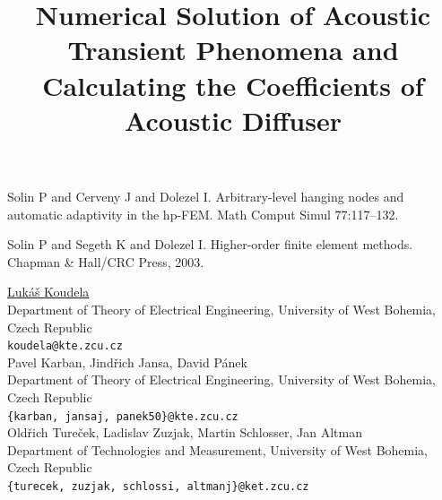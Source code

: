 \documentclass[article, A4, 11pt]{llncs}%
\begin{document}

\begin{thebibliography}{10}
{\sc Solin P and Cerveny J and Dolezel I}. {Arbitrary-level hanging nodes and automatic adaptivity in the hp-FEM}. Math Comput Simul 77:117–132.

{\sc Solin P and Segeth K and Dolezel I}. {Higher-order finite element methods}. Chapman \& Hall/CRC Press, 2003.
\end{thebibliography} %

\title{Numerical Solution of Acoustic Transient Phenomena and Calculating the Coefficients of Acoustic Diffuser}
 \author{} \institute{}
\maketitle
\begin{center}
{\large \underline{Lukáš Koudela}}\\
Department of Theory of Electrical Engineering, University of West Bohemia, Czech Republic\\
{\tt koudela@kte.zcu.cz}
\\ \vspace{4mm}
{\large Pavel Karban, Jindřich Jansa, David Pánek}\\
Department of Theory of Electrical Engineering, University of West Bohemia, Czech Republic\\
{\tt \{karban, jansaj, panek50\}@kte.zcu.cz}
\\ \vspace{4mm}
{\large Oldřich Tureček, Ladislav Zuzjak, Martin Schlosser, Jan Altman}\\
Department of Technologies and Measurement, University of West Bohemia, Czech Republic\\
{\tt \{turecek, zuzjak, schlossi, altmanj\}@ket.zcu.cz}
\end{center}
\end{document}
